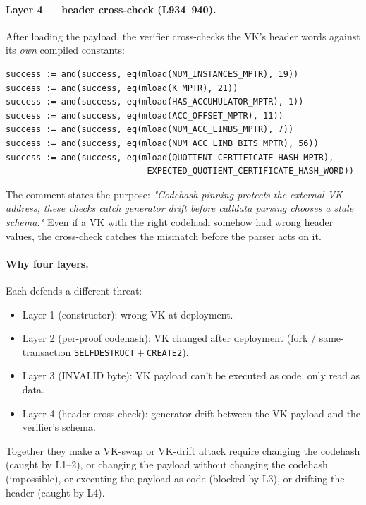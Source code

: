 \paragraph{Layer 4 --- header cross-check (L934--940).} After
loading the payload, the verifier cross-checks the VK's header
words against its \emph{own} compiled constants:
\begin{lstlisting}[style=yul]
success := and(success, eq(mload(NUM_INSTANCES_MPTR), 19))
success := and(success, eq(mload(K_MPTR), 21))
success := and(success, eq(mload(HAS_ACCUMULATOR_MPTR), 1))
success := and(success, eq(mload(ACC_OFFSET_MPTR), 11))
success := and(success, eq(mload(NUM_ACC_LIMBS_MPTR), 7))
success := and(success, eq(mload(NUM_ACC_LIMB_BITS_MPTR), 56))
success := and(success, eq(mload(QUOTIENT_CERTIFICATE_HASH_MPTR),
                            EXPECTED_QUOTIENT_CERTIFICATE_HASH_WORD))
\end{lstlisting}
The comment states the purpose: \emph{"Codehash pinning protects
the external VK address; these checks catch generator drift before
calldata parsing chooses a stale schema."} Even if a VK with the
right codehash somehow had wrong header values, the cross-check
catches the mismatch before the parser acts on it.

\paragraph{Why four layers.} Each defends a different threat:
\begin{itemize}[leftmargin=1.5em,itemsep=1pt]
  \item Layer 1 (constructor): wrong VK at deployment.
  \item Layer 2 (per-proof codehash): VK changed after deployment
        (fork / same-transaction \texttt{SELFDESTRUCT}${}+{}$\texttt{CREATE2}).
  \item Layer 3 (INVALID byte): VK payload can't be executed as
        code, only read as data.
  \item Layer 4 (header cross-check): generator drift between the
        VK payload and the verifier's schema.
\end{itemize}
Together they make a VK-swap or VK-drift attack require changing
the codehash (caught by L1--2), or changing the payload without
changing the codehash (impossible), or executing the payload as
code (blocked by L3), or drifting the header (caught by L4).

